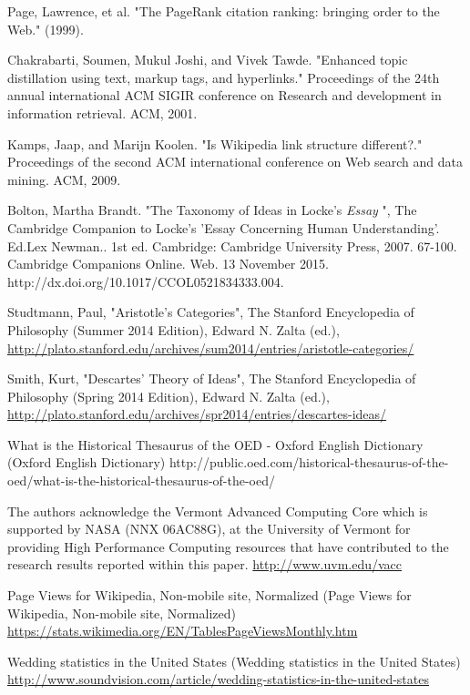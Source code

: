 \documentclass[pre,twocolumn,twoside,superscriptaddress,floatfix, aps, 10pt]{revtex4-1}
\begin{document}
\begin{thebibliography}{1}
       Page, Lawrence, et al. "The PageRank citation ranking: bringing order to the Web." (1999).

       Chakrabarti, Soumen, Mukul Joshi, and Vivek Tawde. "Enhanced topic distillation using text, markup tags, and hyperlinks." Proceedings of the 24th annual international ACM SIGIR conference on Research and development in information retrieval. ACM, 2001.

       Kamps, Jaap, and Marijn Koolen. "Is Wikipedia link structure different?." Proceedings of the second ACM international conference on Web search and data mining. ACM, 2009.

     Bolton, Martha Brandt. "The Taxonomy of Ideas in Locke’s {\it Essay} ", The Cambridge Companion to Locke's 'Essay Concerning Human Understanding'. Ed.Lex Newman.. 1st ed. Cambridge: Cambridge University Press, 2007. 67-100. Cambridge Companions Online. Web. 13 November 2015. http://dx.doi.org/10.1017/CCOL0521834333.004.

     Studtmann, Paul, "Aristotle's Categories", The Stanford Encyclopedia of Philosophy (Summer 2014 Edition), Edward N. Zalta (ed.), \url{http://plato.stanford.edu/archives/sum2014/entries/aristotle-categories/}

     Smith, Kurt, "Descartes' Theory of Ideas", The Stanford Encyclopedia of Philosophy (Spring 2014 Edition), Edward N. Zalta (ed.), \url{http://plato.stanford.edu/archives/spr2014/entries/descartes-ideas/}


     What is the Historical Thesaurus of the OED - Oxford English Dictionary (Oxford English Dictionary)
    http://public.oed.com/historical-thesaurus-of-the-oed/what-is-the-historical-thesaurus-of-the-oed/

     The authors acknowledge the Vermont Advanced Computing Core which is supported by NASA (NNX 06AC88G), at the University of Vermont for providing High Performance Computing resources that have contributed to the research results reported within this paper.
    \url{http://www.uvm.edu/vacc}

     Page Views for Wikipedia, Non-mobile site, Normalized (Page Views for Wikipedia, Non-mobile site, Normalized)
    \url{https://stats.wikimedia.org/EN/TablesPageViewsMonthly.htm}

     Wedding statistics in the United States (Wedding statistics in the United States)
    \url{http://www.soundvision.com/article/wedding-statistics-in-the-united-states}


\end{thebibliography}
\end{document}
